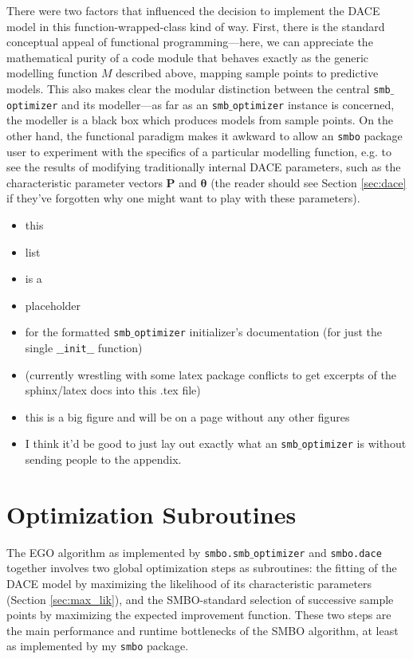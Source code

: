 There were two factors that influenced the decision to implement the DACE model in this function-wrapped-class kind of way.
First, there is the standard conceptual appeal of functional programming---here, we can appreciate the mathematical purity of a code module that behaves exactly as the generic modelling function $M$ described above, mapping sample points to predictive models. This also makes clear the modular distinction between the central \texttt{smb$\_$optimizer} and its modeller---as far as an \texttt{smb$\_$optimizer} instance is concerned, the modeller is a black box which produces models from sample points. On the other hand, the functional paradigm makes it awkward to allow an \texttt{smbo} package user to experiment with the specifics of a particular modelling function, e.g. to see the results of modifying traditionally internal DACE parameters, such as the characteristic parameter vectors $\mathbf{P}$ and $\mathbf{\theta}$ (the reader should see Section \ref{sec:dace} if they've forgotten why one might want to play with these parameters). 
\begin{itemize}\label{fig:smb_optimizer}
\item{this}
\item{list}
\item{is a}
\item{placeholder}
\item{for the formatted \texttt{smb$\_$optimizer} initializer's documentation (for just the single \texttt{$\_ \_ $init$\_ \_$} function)}
\item{(currently wrestling with some latex package conflicts to get excerpts of the sphinx/latex docs into this .tex file)}
\item{this is a big figure and will be on a page without any other figures}
\item{I think it'd be good to just lay out exactly what an \texttt{smb$\_$optimizer} is without sending people to the appendix.}
\end{itemize}


\section{Optimization Subroutines}
The EGO algorithm as implemented by \texttt{smbo.smb$\_$optimizer} and \texttt{smbo.dace} together involves two global optimization steps as subroutines: the fitting of the DACE model by maximizing the likelihood of its characteristic parameters (Section \ref{sec:max_lik}), and the SMBO-standard selection of successive sample points by maximizing the expected improvement function. These two steps are the main performance and runtime bottlenecks of the SMBO algorithm, at least as implemented by my \texttt{smbo} package.

